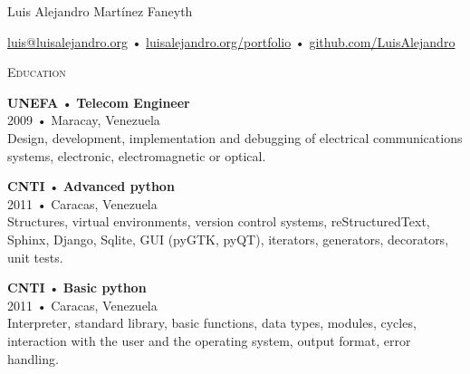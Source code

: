 \documentclass[12pt]{article}
\begin{document}
\centering
\begin{cv}{Luis Alejandro Mart\'inez Faneyth}
  
  \vspace{0.25em}
  \href{mailto:luis@luisalejandro.org}{luis@luisalejandro.org} •
  \href{https://luisalejandro.org/portfolio}{luisalejandro.org/portfolio} •
  \href{http://github.com/LuisAlejandro}{github.com/LuisAlejandro}
  \vspace{0.125em}

  \hrulefill

  \begin{minipage}[t]{0.35\textwidth}
    \vspace{0.125em}
    
    \begin{minipage}{\linewidth}
      \textrm{\textsc{\Large{Education}}}
      \newline
      \parbox[t]{\linewidth}{
        \textbf{UNEFA} • \textrm{\textbf{Telecom Engineer}}\\
        2009 • Maracay, Venezuela\\
        \footnotesize{Design, development, implementation and debugging of electrical communications systems, electronic, electromagnetic or optical.}\\
      }
      \newline
      \parbox[t]{\linewidth}{
        \textbf{CNTI} • \textrm{\textbf{Advanced python}}\\
        2011 • Caracas, Venezuela\\
        \footnotesize{Structures, virtual environments, version control systems, reStructuredText, Sphinx, Django, Sqlite, GUI (pyGTK, pyQT), iterators, generators, decorators, unit tests.}\\
      }
      \newline
      \parbox[t]{\linewidth}{
        \textbf{CNTI} • \textrm{\textbf{Basic python}}\\
        2011 • Caracas, Venezuela\\
        \footnotesize{Interpreter, standard library, basic functions, data types, modules, cycles, interaction with the user and the operating system, output format, error handling.}\\
      }
      \newline
    \end{minipage}


\end{minipage}
\end{cv}
\end{document}
